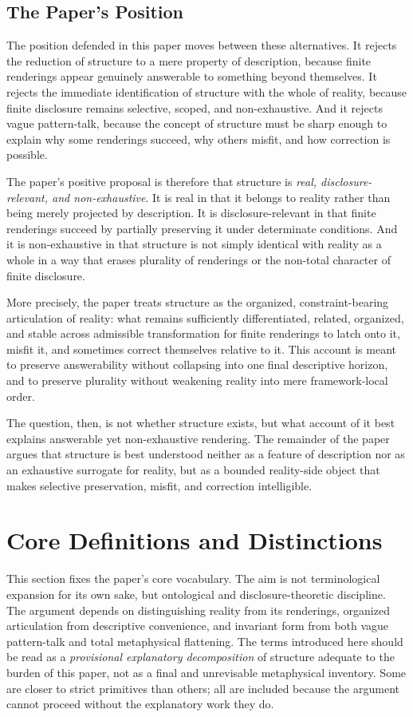 \documentclass[11pt]{article}
\renewcommand{\emph}[1]{\textit{#1}}
\begin{document}
\subsection{The Paper's Position}

The position defended in this paper moves between these alternatives. It rejects the reduction of structure to a mere property of description, because finite renderings appear genuinely answerable to something beyond themselves. It rejects the immediate identification of structure with the whole of reality, because finite disclosure remains selective, scoped, and non-exhaustive. And it rejects vague pattern-talk, because the concept of structure must be sharp enough to explain why some renderings succeed, why others misfit, and how correction is possible.

The paper's positive proposal is therefore that structure is \emph{real, disclosure-relevant, and non-exhaustive}. It is real in that it belongs to reality rather than being merely projected by description. It is disclosure-relevant in that finite renderings succeed by partially preserving it under determinate conditions. And it is non-exhaustive in that structure is not simply identical with reality as a whole in a way that erases plurality of renderings or the non-total character of finite disclosure.

More precisely, the paper treats structure as the organized, constraint-bearing articulation of reality: what remains sufficiently differentiated, related, organized, and stable across admissible transformation for finite renderings to latch onto it, misfit it, and sometimes correct themselves relative to it. This account is meant to preserve answerability without collapsing into one final descriptive horizon, and to preserve plurality without weakening reality into mere framework-local order.

The question, then, is not whether structure exists, but what account of it best explains answerable yet non-exhaustive rendering. The remainder of the paper argues that structure is best understood neither as a feature of description nor as an exhaustive surrogate for reality, but as a bounded reality-side object that makes selective preservation, misfit, and correction intelligible.
\section{Core Definitions and Distinctions}

This section fixes the paper's core vocabulary. The aim is not terminological expansion for its own sake, but ontological and disclosure-theoretic discipline. The argument depends on distinguishing reality from its renderings, organized articulation from descriptive convenience, and invariant form from both vague pattern-talk and total metaphysical flattening. The terms introduced here should be read as a \emph{provisional explanatory decomposition} of structure adequate to the burden of this paper, not as a final and unrevisable metaphysical inventory. Some are closer to strict primitives than others; all are included because the argument cannot proceed without the explanatory work they do.
\end{document}
